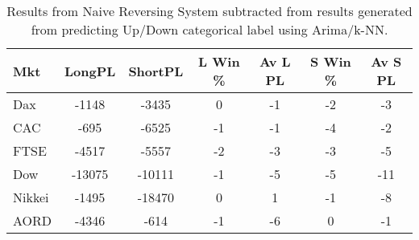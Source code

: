 \begin{table}[ht]
\centering
\caption[Predicting UpDn CAT - Arima/k-NN predictions passed to System 4 - ]{Results from Naive Reversing System subtracted from results generated from predicting Up/Down categorical label using Arima/k-NN.} 
\label{tab:chp_ts:pUD_CAT_arima_knn_sys_diff}
\begin{tabular}{lcccccc}
  \toprule Mkt & LongPL & ShortPL & L Win \% & Av L PL & S Win \% & Av S PL \\ 
  \midrule Dax & -1148 & -3435 & 0 & -1 & -2 & -3 \\ 
  CAC & -695 & -6525 & -1 & -1 & -4 & -2 \\ 
  FTSE & -4517 & -5557 & -2 & -3 & -3 & -5 \\ 
  Dow & -13075 & -10111 & -1 & -5 & -5 & -11 \\ 
  Nikkei & -1495 & -18470 & 0 & 1 & -1 & -8 \\ 
  AORD & -4346 & -614 & -1 & -6 & 0 & -1 \\ 
   \bottomrule \end{tabular}
\end{table}
